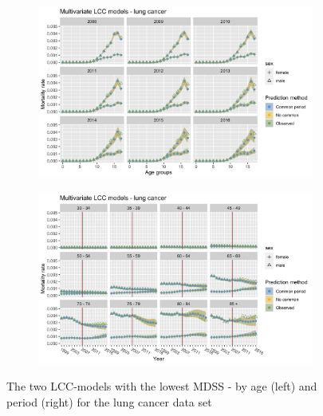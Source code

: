 \begin{figure}
    \centering
    \begin{subfigure}[b]{.45\linewidth}
        \includegraphics[width=\linewidth]{real-data/real-data-multivariate/Figures/multivariate-LCC-by-age-lung.png}
    \end{subfigure}
    \begin{subfigure}[b]{.45\linewidth}
        \includegraphics[width=\linewidth]{real-data/real-data-multivariate/Figures/multivariate-LCC-by-period-lung.png}
    \end{subfigure}
    \caption{The two LCC-models with the lowest MDSS - by age (left) and period (right) for the lung cancer data set}
    \label{fig:mv-LCC-lung}
\end{figure}

